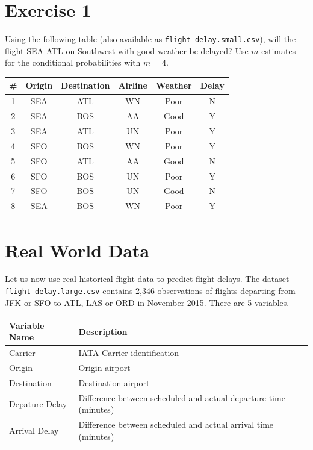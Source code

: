 \documentclass[11pt]{article}
\begin{document}
\section{Exercise 1}

Using the following table (also available as \texttt{flight-delay.small.csv}),
will the flight SEA-ATL on Southwest with good weather be delayed?
Use $m$-estimates for the conditional probabilities with $m = 4$.

\begin{center}
\begin{tabular}{cccccc}
\toprule
\# & Origin & Destination & Airline & Weather & Delay
\\ \midrule
1 & SEA & ATL & WN & Poor & N \\
2 & SEA & BOS & AA & Good & Y \\
3 & SEA & ATL & UN & Poor & Y \\
4 & SFO & BOS & WN & Poor & Y \\
5 & SFO & ATL & AA & Good & N \\
6 & SFO & BOS & UN & Poor & Y \\
7 & SFO & BOS & UN & Good & N \\
8 & SEA & BOS & WN & Poor & Y \\
\bottomrule
\end{tabular}
\end{center}

\section{Real World Data}

Let us now use real historical flight data to predict flight delays.
The dataset \texttt{flight-delay.large.csv} contains 2,346 observations of flights
departing from JFK or SFO to ATL, LAS or ORD in November 2015.
There are 5 variables.

\begin{center}
\begin{tabular}{ll}
\toprule
Variable Name & Description
\\ \midrule
Carrier & IATA Carrier identification \\
Origin & Origin airport \\
Destination & Destination airport \\
Depature Delay & Difference between scheduled and actual departure time (minutes) \\
Arrival Delay & Difference between scheduled and actual arrival time (minutes) \\
\bottomrule
\end{tabular}
\end{center}
\end{document}
